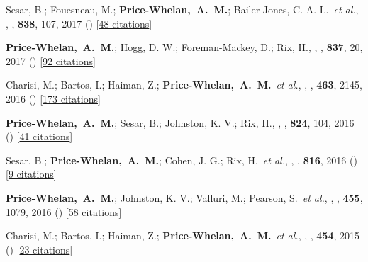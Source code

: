 \item[{\color{deemph}\scriptsize25}]Sesar, B.; Fouesneau, M.; \textbf{Price-Whelan,~A.~M.}; Bailer-Jones, C. A. L.~\textit{et al.}, , \apj, \textbf{838}, 107, 2017 () [\href{http://adsabs.harvard.edu/abs/2017ApJ...838..107S}{48 citations}]

\item[{\color{deemph}\scriptsize24}]\textbf{Price-Whelan,~A.~M.}; Hogg, D. W.; Foreman-Mackey, D.; Rix, H., , \apj, \textbf{837}, 20, 2017 () [\href{http://adsabs.harvard.edu/abs/2017ApJ...837...20P}{92 citations}]

\item[{\color{deemph}\scriptsize23}]Charisi, M.; Bartos, I.; Haiman, Z.; \textbf{Price-Whelan,~A.~M.}~\textit{et al.}, , \mnras, \textbf{463}, 2145, 2016 () [\href{http://adsabs.harvard.edu/abs/2016MNRAS.463.2145C}{173 citations}]

\item[{\color{deemph}\scriptsize22}]\textbf{Price-Whelan,~A.~M.}; Sesar, B.; Johnston, K. V.; Rix, H., , \apj, \textbf{824}, 104, 2016 () [\href{http://adsabs.harvard.edu/abs/2016ApJ...824..104P}{41 citations}]

\item[{\color{deemph}\scriptsize21}]Sesar, B.; \textbf{Price-Whelan,~A.~M.}; Cohen, J. G.; Rix, H.~\textit{et al.}, , \apj, \textbf{816}, 2016 () [\href{http://adsabs.harvard.edu/abs/2016ApJ...816L...4S}{9 citations}]

\item[{\color{deemph}\scriptsize20}]\textbf{Price-Whelan,~A.~M.}; Johnston, K. V.; Valluri, M.; Pearson, S.~\textit{et al.}, , \mnras, \textbf{455}, 1079, 2016 () [\href{http://adsabs.harvard.edu/abs/2016MNRAS.455.1079P}{58 citations}]

\item[{\color{deemph}\scriptsize19}]Charisi, M.; Bartos, I.; Haiman, Z.; \textbf{Price-Whelan,~A.~M.}~\textit{et al.}, , \mnras, \textbf{454}, 2015 () [\href{http://adsabs.harvard.edu/abs/2015MNRAS.454L..21C}{23 citations}]

